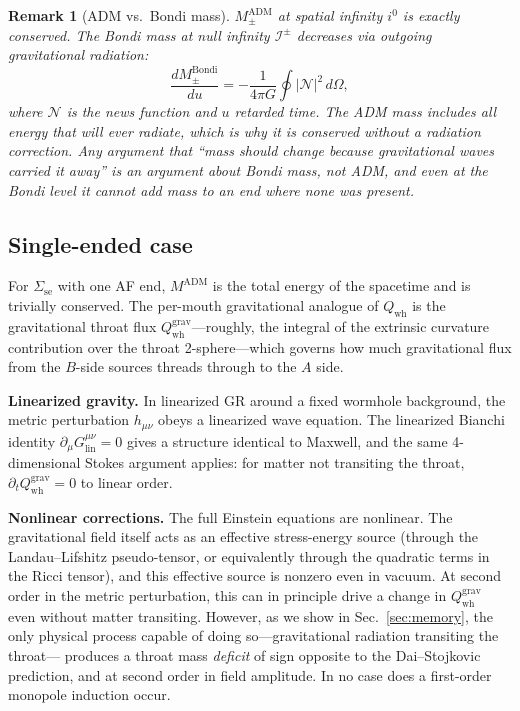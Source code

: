 \documentclass[aps,prd,onecolumn,nofootinbib,superscriptaddress]{revtex4-2}
\newtheorem{remark}{Remark}
\begin{document}
\begin{remark}[ADM vs.\ Bondi mass]
\label{rem:adm-vs-bondi}
$M_\pm^{\mathrm{ADM}}$ at spatial infinity $i^0$ is exactly conserved.  The
Bondi mass at null infinity $\mathcal{I}^\pm$ decreases via outgoing
gravitational radiation:
\begin{equation}
  \frac{dM_\pm^{\mathrm{Bondi}}}{du}
  = -\frac{1}{4\pi G}\oint|\mathcal{N}|^2\,d\Omega,
\end{equation}
where $\mathcal{N}$ is the news function and $u$ retarded
time.\cite{BondiVanderBurgMetzner1962Gravitational,Sachs1962Asymptotic}
The ADM mass includes all energy that will ever radiate, which is why it is
conserved without a radiation correction.  Any argument that ``mass should
change because gravitational waves carried it away'' is an argument about
Bondi mass, not ADM, and even at the Bondi level it cannot \emph{add} mass to
an end where none was present.
\end{remark}

\subsection{Single-ended case}
\label{sec:adm-single-ended}

For $\Sigma_{\mathrm{se}}$ with one AF end, $M^{\mathrm{ADM}}$ is the total
energy of the spacetime and is trivially conserved.  The per-mouth gravitational
analogue of $Q_{\mathrm{wh}}$ is the gravitational throat flux
$Q_{\mathrm{wh}}^{\mathrm{grav}}$---roughly, the integral of the extrinsic
curvature contribution over the throat 2-sphere---which governs how much
gravitational flux from the $B$-side sources threads through to the $A$ side.

\textbf{Linearized gravity.}  In linearized GR around a fixed wormhole
background, the metric perturbation $h_{\mu\nu}$ obeys a linearized wave
equation.  The linearized Bianchi identity $\partial_\mu G^{\mu\nu}_{\text{lin}}=0$
gives a structure identical to Maxwell, and the same 4-dimensional Stokes
argument applies: for matter not transiting the throat,
$\partial_t Q_{\mathrm{wh}}^{\mathrm{grav}}=0$ to linear order.

\textbf{Nonlinear corrections.}  The full Einstein equations are nonlinear.
The gravitational field itself acts as an effective stress-energy source
(through the Landau--Lifshitz pseudo-tensor, or equivalently through the
quadratic terms in the Ricci tensor), and this effective source is nonzero even
in vacuum.  At second order in the metric perturbation, this can in principle
drive a change in $Q_{\mathrm{wh}}^{\mathrm{grav}}$ even without matter
transiting.  However, as we show in Sec.~\ref{sec:memory}, the only physical
process capable of doing so---gravitational radiation transiting the throat---
produces a throat mass \emph{deficit} of sign opposite to the Dai--Stojkovic
prediction, and at second order in field amplitude.  In no case does a
first-order monopole induction occur.
\end{document}
